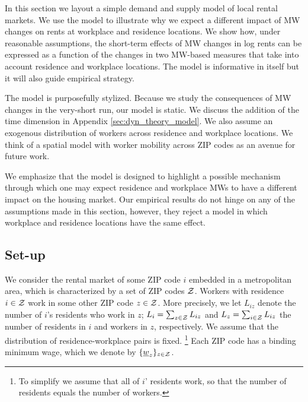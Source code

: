
In this section we layout a simple demand and supply model of local rental markets.
We use the model to illustrate why we expect a different impact of MW changes 
on rents at workplace and residence locations. We show how, under reasonable 
assumptions, the short-term effects of MW changes in log rents can be expressed 
as a function of the changes in two MW-based measures that take into account 
residence and workplace locations. The model is informative in itself but it will
also guide empirical strategy.

The model is purposefully stylized.
Because we study the consequences of MW changes in the very-short run, our model is 
static. 
We discuss the addition of the time dimension in Appendix \ref{sec:dyn_theory_model}.
We also assume an exogenous distribution of workers across residence and workplace 
locations.
We think of a spatial model with worker mobility across ZIP codes as an avenue 
for future work.

We emphasize that the model is designed to highlight a possible mechanism through 
which one may expect residence and workplace MWs to have a different impact on the 
housing market. Our empirical results do not hinge on any of the assumptions made 
in this section, however, they reject a model in which workplace and residence locations
have the same effect.

\subsection{Set-up}

We consider the rental market of some ZIP code $i$ embedded in a metropolitan area, 
which is characterized by a set of ZIP codes $\mathcal{Z}$.
Workers with residence $i\in\mathcal{Z}$ work in some other ZIP code $z\in\mathcal{Z}$. 
More precisely, we let $L_{iz}$ denote the number of $i$'s residents who work in $z$;
$L_i = \sum_{z \in \mathcal{Z}} L_{iz}$ and $L_z = \sum_{i \in \mathcal{Z}} L_{iz}$ 
the number of residents in $i$ and workers in $z$, respectively.
We assume that the distribution of residence-workplace pairs is fixed.%
\footnote{To simplify we assume that all of $i$' residents work, so that the number
of residents equals the number of workers.}
Each ZIP code has a binding minimum wage, which we denote by 
$\{\underline{w}_z\}_{z\in\mathcal{Z}}$.

